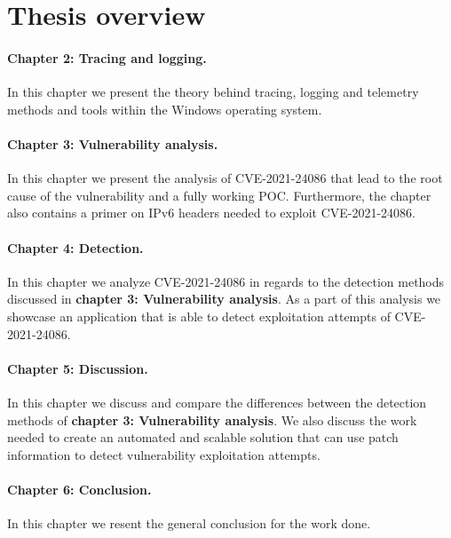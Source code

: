 \documentclass{report}
\begin{document}
\section{Thesis overview}
\paragraph{Chapter 2: Tracing and logging.} In this chapter we present the theory behind tracing, logging and telemetry methods and tools within the Windows operating system.

\paragraph{Chapter 3: Vulnerability analysis.} In this chapter we present the analysis of CVE-2021-24086 that lead to the root cause of the vulnerability and a fully working \gls{POC}. Furthermore, the chapter also contains a primer on IPv6 headers needed to exploit CVE-2021-24086.

\paragraph{Chapter 4: Detection.} In this chapter we analyze CVE-2021-24086 in regards to the detection methods discussed in \textbf{chapter 3: Vulnerability analysis}. As a part of this analysis we showcase an application that is able to detect exploitation attempts of CVE-2021-24086.

\paragraph{Chapter 5: Discussion.} In this chapter we discuss and compare the differences between the detection methods of \textbf{chapter 3: Vulnerability analysis}. We also discuss the work needed to create an automated and scalable solution that can use patch information to detect vulnerability exploitation attempts.

\paragraph{Chapter 6: Conclusion.} In this chapter we resent the general conclusion for the work done.
\end{document}

